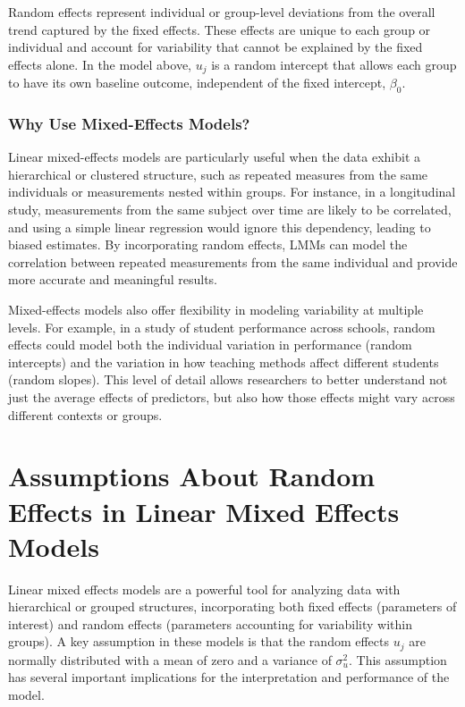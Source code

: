 Random effects represent individual or group-level deviations from the overall trend captured by the fixed effects. These effects are unique to each group or individual and account for variability that cannot be explained by the fixed effects alone. In the model above, $u_j$ is a random intercept that allows each group to have its own baseline outcome, independent of the fixed intercept, $\beta_0$.

\subsubsection*{Why Use Mixed-Effects Models?}
Linear mixed-effects models are particularly useful when the data exhibit a hierarchical or clustered structure, such as repeated measures from the same individuals or measurements nested within groups. For instance, in a longitudinal study, measurements from the same subject over time are likely to be correlated, and using a simple linear regression would ignore this dependency, leading to biased estimates. By incorporating random effects, LMMs can model the correlation between repeated measurements from the same individual and provide more accurate and meaningful results.

Mixed-effects models also offer flexibility in modeling variability at multiple levels. For example, in a study of student performance across schools, random effects could model both the individual variation in performance (random intercepts) and the variation in how teaching methods affect different students (random slopes). This level of detail allows researchers to better understand not just the average effects of predictors, but also how those effects might vary across different contexts or groups.

\section{Assumptions About Random Effects in Linear Mixed Effects Models}

Linear mixed effects models are a powerful tool for analyzing data with hierarchical or grouped structures, incorporating both fixed effects (parameters of interest) and random effects (parameters accounting for variability within groups). A key assumption in these models is that the random effects $u_j$ are normally distributed with a mean of zero and a variance of $\sigma_u^2$. This assumption has several important implications for the interpretation and performance of the model.

